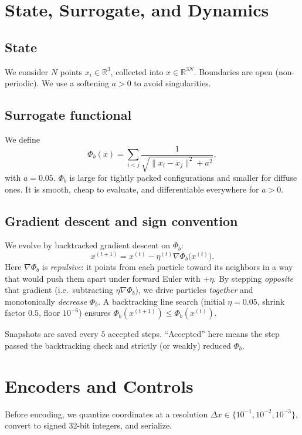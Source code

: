 \documentclass[11pt,a4paper]{article}
\newcommand{\phib}{\Phi_b}
\newcommand{\R}{\mathbb{R}}
\begin{document}
\section{State, Surrogate, and Dynamics}
\subsection{State}
We consider $N$ points $x_i \in \R^3$, collected into $x \in \R^{3N}$. Boundaries are open (non-periodic). We use a softening $a>0$ to avoid singularities.

\subsection{Surrogate functional}
We define
\begin{equation}
\label{eq:phib-def}
\phib(x) = \sum_{i<j} \frac{1}{\sqrt{\lVert x_i - x_j \rVert^2 + a^2}},
\end{equation}
with $a = 0.05$. $\phib$ is large for tightly packed configurations and smaller for diffuse ones. It is smooth, cheap to evaluate, and differentiable everywhere for $a>0$.

\subsection{Gradient descent and sign convention}
We evolve by backtracked gradient descent on $\phib$:
\begin{equation}
x^{(t+1)} = x^{(t)} - \eta^{(t)} \nabla \phib\big(x^{(t)}\big).
\end{equation}
Here $\nabla\phib$ is \emph{repulsive}: it points from each particle toward its neighbors in a way that would push them apart under forward Euler with $+\eta$. By stepping \emph{opposite} that gradient (i.e.\ subtracting $\eta\nabla\phib$), we drive particles \emph{together} and monotonically \emph{decrease} $\phib$. A backtracking line search (initial $\eta{=}0.05$, shrink factor $0.5$, floor $10^{-6}$) ensures $\phib(x^{(t+1)}) \le \phib(x^{(t)})$.

Snapshots are saved every $5$ accepted steps. ``Accepted'' here means the step passed the backtracking check and strictly (or weakly) reduced $\phib$.

\section{Encoders and Controls}
Before encoding, we quantize coordinates at a resolution $\Delta x \in \{10^{-1},10^{-2},10^{-3}\}$, convert to signed 32-bit integers, and serialize.
\end{document}
